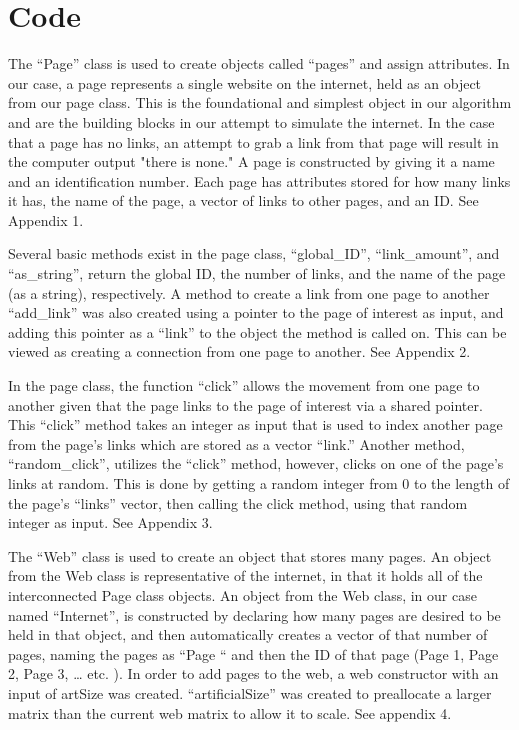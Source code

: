 \documentclass{article}
\begin{document}
\section{Code}
\bigskip
\quad\quad The “Page” class is used to create objects called “pages” and assign attributes. In our case, a page represents a single website on the internet, held as an object from our page class. This is the foundational and simplest object in our algorithm and are the building blocks in our attempt to simulate the internet. In the case that a page has no links, an attempt to grab a link from that page will result in the computer output "there is none." A page is constructed by giving it a name and an identification number. Each page has attributes stored for how many links it has, the name of the page, a vector of links to other pages, and an ID. See Appendix 1.
 \bigskip

 Several basic methods exist in the page class, “global\_ID”, “link\_amount”, and “as\_string”, return the global ID, the number of links, and the name of the page (as a string), respectively. A method to create a link from one page to another “add\_link” was also created using a pointer to the page of interest as input, and adding this pointer as a “link” to the object the method is called on. This can be viewed as creating a connection from one page to another. See Appendix 2.
 \bigskip

 In the page class, the function “click” allows the movement from one page to another given that the page links to the page of interest via a shared pointer. This “click” method takes an integer as input that is used to index another page from the page’s links which are stored as a vector “link.”  Another method, “random\_click”,  utilizes the “click” method, however, clicks on one of the page's links at random. This is done by getting a random integer from 0 to the length of the page's “links” vector, then calling the click method, using that random integer as input. See Appendix 3.
 \bigskip \bigskip \bigskip

The “Web” class is used to create an object that stores many pages. An object from the Web class is representative of the internet, in that it holds all of the interconnected Page class objects. An object from the Web class, in our case named “Internet”, is constructed by declaring how many pages are desired to be held in that object, and then automatically creates a vector of that number of pages, naming the pages as “Page “ and then the ID of that page (Page 1, Page 2, Page 3, … etc. ). In order to add pages to the web, a web constructor with an input of artSize was created. “artificialSize” was created to preallocate a larger matrix than the current web matrix to allow it to scale. See appendix 4.
\bigskip
\end{document}
